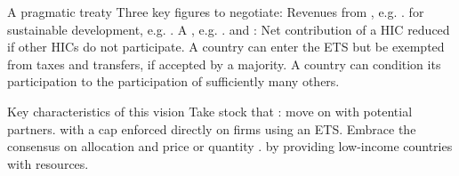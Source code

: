 \documentclass[aspectratio=169,xcolor=dvipsnames, 11pt,mathserif]{beamer}
\begin{document}
\begin{frame}{A pragmatic treaty}
    \bbsp
    \ip Three key figures to negotiate:
    \bbsp \ip Revenues from , e.g. .
    \ip {} for sustainable development, e.g. .
    \ip A , e.g. .
    \ee
    \ip {} and :
    \bbsp \ip Net contribution of a HIC reduced if other HICs do not participate.
    \ip A country can enter the ETS but be exempted from taxes and transfers, if accepted by a majority.
    \ip A country can condition its participation to the participation of sufficiently many others.
    \ee
    \ee
\end{frame}

\begin{frame}{Key characteristics of this vision}
\bbsp \ip Take stock that : move on with potential partners.
\ip {} with a cap enforced directly on firms using an ETS.
\ip Embrace the consensus on  allocation and  price or quantity .
\ip {} by providing low-income countries with resources.%
\ee
\end{frame}






\end{document}
